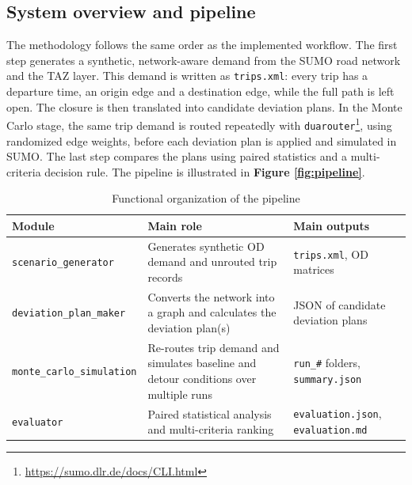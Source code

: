 \subsection{System overview and pipeline}
The methodology follows the same order as the implemented workflow. The first
step generates a synthetic, network-aware demand from the SUMO road network
and the TAZ layer. This demand is written as \texttt{trips.xml}: every trip
has a departure time, an origin edge and a destination edge, while the full
path is left open. The closure is then translated into candidate deviation
plans. In the Monte Carlo stage, the same trip demand is routed repeatedly
with \texttt{duarouter}\footnote{\href{https://sumo.dlr.de/docs/CLI.html}{https://sumo.dlr.de/docs/CLI.html}}, using randomized edge weights, before each deviation
plan is applied and simulated in SUMO. The last step compares the plans using
paired statistics and a multi-criteria decision rule. The pipeline is illustrated in
\textbf{Figure \ref{fig:pipeline}}.

\begin{table}[htbp]
\centering
\begin{tabularx}{\linewidth}{@{}l>{\raggedright\arraybackslash}X>{\raggedright\arraybackslash}X@{}}
\toprule
Module & Main role & Main outputs \\
\midrule
\texttt{scenario\_generator} & Generates synthetic OD demand and unrouted trip records & \texttt{trips.xml}, OD matrices \\
\texttt{deviation\_plan\_maker} & Converts the network into a graph and calculates the deviation plan(s) & JSON of candidate deviation plans \\
\texttt{monte\_carlo\_simulation} & Re-routes trip demand and simulates baseline and detour conditions over multiple runs & \texttt{run\_\#} folders, \texttt{summary.json} \\
\texttt{evaluator} & Paired statistical analysis and multi-criteria ranking & \texttt{evaluation.json}, \texttt{evaluation.md} \\
\bottomrule
\end{tabularx}
\caption{Functional organization of the pipeline}
\end{table}

